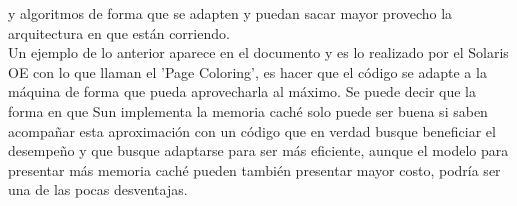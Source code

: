 \documentclass[%
	final,
	notitlepage,
	narroweqnarray,
	inline,
	twoside,
	]{ieee}
\begin{document}
y algoritmos de forma que se adapten y puedan sacar mayor provecho la arquitectura en
que están corriendo.\\
Un ejemplo de lo anterior aparece en el documento y es lo realizado por el Solaris OE
con lo que llaman el 'Page Coloring', es hacer que el código se adapte a la máquina de
forma que pueda aprovecharla al máximo.
Se puede decir que la forma en que Sun implementa la memoria caché solo puede ser
buena si saben acompañar esta aproximación con un código que en verdad busque
beneficiar el desempeño y que busque adaptarse para ser más eficiente, aunque el
modelo para presentar más memoria caché pueden también presentar mayor costo,
podría ser una de las pocas desventajas.





\end{document}

